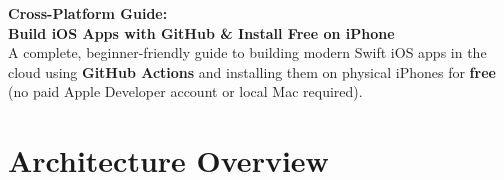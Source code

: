 \documentclass[11pt,a4paper]{article}
\begin{document}
\thispagestyle{plain}

\begin{center}
    {\huge\bfseries\sffamily Cross-Platform Guide:\\[6pt]
    Build iOS Apps with GitHub \& Install Free on iPhone}\\[12pt]
    {\large\sffamily\color{gray} A complete, beginner-friendly guide to building modern Swift iOS apps in the cloud using \textbf{GitHub Actions} and installing them on physical iPhones for \textbf{free} (no paid Apple Developer account or local Mac required).}
\end{center}

\vspace{10pt}

{}
\section*{Architecture Overview}

\vspace{4pt}
\end{document}
